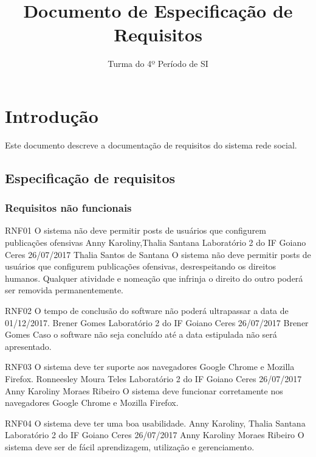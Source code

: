 \documentclass[versao=digital]{ifgoiano_ceres_tc_v2}
\title{Documento de Especificação de Requisitos}
\author{Turma do 4º Período de SI}
\begin{document}
	
	
	\chapter{Introdução}
	
	Este documento descreve a documentação de requisitos do sistema rede social.
	
	\section{Especificação de requisitos}
	
	\subsection{Requisitos não funcionais}
	\requisitoNaoFuncional
{RNF01}
{O sistema não deve permitir posts de usuários que configurem publicações ofensivas}
{Anny Karoliny,Thalia Santana}
{Laboratório 2 do IF Goiano Ceres}
{26/07/2017}
{Thalia Santos de Santana}
{O sistema não deve permitir posts de usuários que configurem publicações ofensivas, desrespeitando os direitos humanos. Qualquer atividade e nomeação que infrinja o direito do outro poderá ser removida permanentemente.
}

\requisitoNaoFuncional
{RNF02}
{O tempo de conclusão do software não poderá ultrapassar a data de 01/12/2017.}
{Brener Gomes}
{Laboratório 2 do IF Goiano Ceres}
{26/07/2017}
{Brener Gomes}
{Caso o software não seja concluído até a data estipulada não será apresentado.
}

\requisitoNaoFuncional
{RNF03}
{O sistema  deve ter suporte aos navegadores Google Chrome e Mozilla Firefox.}
{Ronneesley Moura Teles}
{Laboratório 2 do IF Goiano Ceres}
{26/07/2017}
{Anny Karoliny Moraes Ribeiro}
{O sistema deve funcionar corretamente nos navegadores Google Chrome e Mozilla Firefox.
}

\requisitoNaoFuncional
{RNF04}
{O sistema deve ter uma boa usabilidade.}
{Anny Karoliny, Thalia Santana}
{Laboratório 2 do IF Goiano Ceres}
{26/07/2017}
{Anny Karoliny Moraes Ribeiro}
{O sistema deve ser de fácil aprendizagem, utilização e gerenciamento.
}
\end{document}
